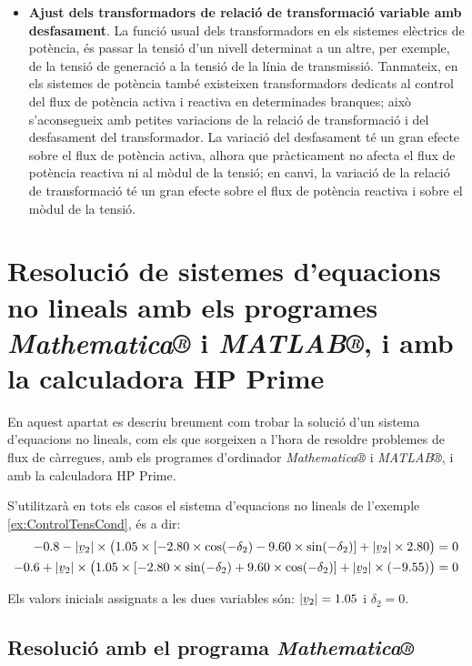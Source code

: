 \begin{itemize}
   \item \textbf{Ajust  dels transformadors de relació de transformació variable amb   desfasament}. La funció usual dels transformadors en els sistemes elèctrics de potència,
    és passar la tensió d'un nivell determinat a un altre, per exemple, de la tensió de generació
    a la tensió de la línia de transmissió. Tanmateix, en els sistemes de potència també existeixen
    transformadors dedicats al control del flux de potència activa i reactiva en determinades
    branques; això s'aconsegueix amb petites variacions de la relació de transformació i del
    desfasament del transformador. La variació del desfasament té un gran efecte sobre el flux
    de potència activa, alhora que pràcticament no afecta el flux de potència reactiva ni al
    mòdul de la tensió; en canvi, la variació de la relació de transformació té un gran efecte
    sobre el flux de potència reactiva i sobre el mòdul de la tensió.
\end{itemize}

\section{Resolució de sistemes d'equacions no lineals amb els programes \emph{Mathematica®} i
\emph{MATLAB®},  i amb la calculadora \textsf{HP Prime}}
\label{sec:sis_eq_no_lin}


En aquest apartat es descriu breument com trobar la solució d'un sistema d'equacions no lineals, com els que sorgeixen a l'hora de resoldre problemes de flux de càrregues, amb els programes d'ordinador \emph{Mathematica®} i \emph{MATLAB®}, i amb la calculadora \textsf{HP Prime}.

S'utilitzarà en tots els casos el sistema d'equacions no lineals de l'exemple \vref{ex:ControlTensCond}, és a dir:
\begin{align*}
\num{-0,8} - |\cmplx{v}_2| \times \bigl( \num{1,05}\times [\num{-2,80}\times \cos(-\delta_2) - \num{9,60} \times
\sin( -\delta_2)]  + |\cmplx{v}_2| \times \num{2,80} \bigr) &= 0 \\
-\num{0,6} + |\cmplx{v}_2| \times\bigl( \num{1,05} \times[\num{-2,80}\times\sin(-\delta_2) +
\num{9,60}\times\cos( -\delta_2)]  + |\cmplx{v}_2|\times (\num{-9,55}) \bigr) &= 0
\end{align*}

Els valors inicials assignats a les dues variables són: $|\cmplx{v}_2|=\num{1,05}$ i $\delta_2=0$.

\subsection{Resolució amb el programa \emph{Mathematica®}}

